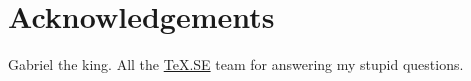 \chapter{Acknowledgements}
Gabriel the king. All the \href{https://tex.stackexchange.com/}{\TeX.SE} team for answering my stupid questions.


